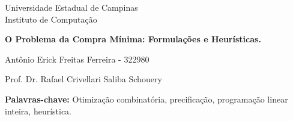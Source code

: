 \begin{titlepage}
    \centering
    
    {\large Universidade Estadual de Campinas \\}
    {\large Instituto de Computação \\[2cm]}
    
    {\LARGE \textbf{O Problema da Compra Mínima: Formulações e Heurísticas.} \\[2cm]}
    
    {\large Antônio Erick Freitas Ferreira - 322980 \\}

    {\large Prof. Dr. Rafael Crivellari Saliba Schouery}

    

    {\textbf{Palavras-chave:} Otimização combinatória, precificação, programação linear inteira, heurística.}
\end{titlepage}